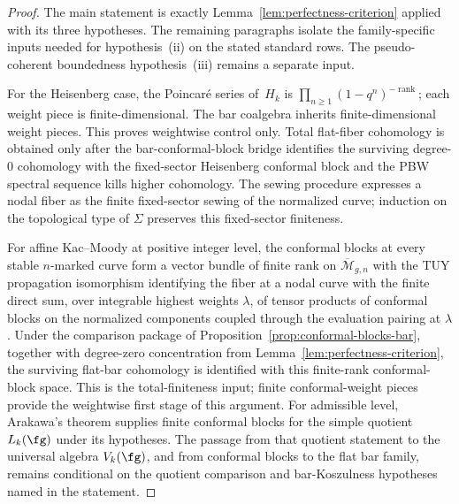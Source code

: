 \begin{proof}
The main statement is exactly
Lemma~\ref{lem:perfectness-criterion} applied with its three
hypotheses. The remaining paragraphs isolate the family-specific
inputs needed for hypothesis~\textup{(ii)} on the stated standard
rows. The pseudo-coherent boundedness hypothesis~\textup{(iii)}
remains a separate input.

For the Heisenberg case, the Poincar\'e series of~$H_k$ is
$\prod_{n \geq 1}(1 - q^n)^{-\operatorname{rank}}$; each weight
piece is finite-dimensional. The bar coalgebra inherits
finite-dimensional weight pieces. This proves weightwise control
only. Total flat-fiber cohomology is
obtained only after the bar-conformal-block bridge identifies the
surviving degree-$0$ cohomology with the fixed-sector Heisenberg
conformal block and the PBW spectral sequence kills higher
cohomology. The sewing procedure expresses a nodal fiber as the
finite fixed-sector sewing of the normalized curve; induction on the
topological type of $\Sigma$ preserves this fixed-sector finiteness.

For affine Kac--Moody at positive integer level, the conformal
blocks at every stable $n$-marked curve form a vector bundle of
finite rank on $\overline{\mathcal{M}}_{g,n}$ with the TUY
propagation isomorphism identifying the fiber at a nodal curve
with the finite direct sum, over integrable highest weights
$\lambda$, of tensor products of conformal blocks on the
normalized components coupled through the evaluation pairing at
$\lambda$. Under the comparison package of
Proposition~\ref{prop:conformal-blocks-bar}, together with
degree-zero concentration from
Lemma~\ref{lem:perfectness-criterion}, the surviving flat-bar
cohomology is identified with this finite-rank conformal-block space.
This is the total-finiteness input; finite conformal-weight pieces
provide the weightwise first stage of this argument.
For admissible level, Arakawa's theorem supplies finite conformal
blocks for the simple quotient $L_k(\fg)$ under its hypotheses. The
passage from that quotient statement to the universal algebra
$V_k(\fg)$, and from conformal blocks to the flat bar family, remains
conditional on the quotient comparison and bar-Koszulness hypotheses
named in the statement.


\end{proof}
